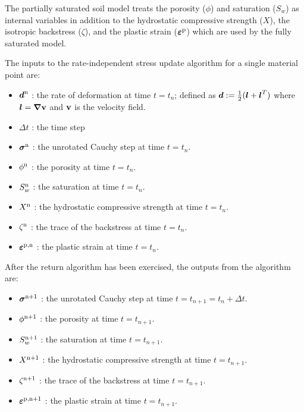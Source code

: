 The partially saturated soil model treats the porosity ($\phi$) and saturation ($S_w$) as internal 
variables in addition to the hydrostatic compressive strength ($X$), the isotropic backstress ($\zeta$), 
and the plastic strain ($\boldsymbol{\varepsilon}^{\text{p}}$) which are used by the fully saturated model.

The inputs to the rate-independent stress update algorithm for a single material point are:
\begin{itemize}
  \item $\boldsymbol{d}^{\text{n}}$ : {\Ochre the rate of deformation at time $t = t_n$; 
        defined as $\boldsymbol{d} := \tfrac{1}{2}(\boldsymbol{l} + \boldsymbol{l}^T)$ where 
        $\boldsymbol{l} = \boldsymbol{\nabla} \mathbf{v}$ and $\mathbf{v}$ is the velocity field.}
  \item $\Delta t$ : {\Ochre the time step}
  \item $\boldsymbol{\sigma}^{\text{n}}$ : {\Ochre the unrotated Cauchy step at time $t = t_n$.}
  \item $\phi^{\text{n}}$ : {\Ochre the porosity at time $t = t_n$.}
  \item $S_w^{\text{n}}$ : {\Ochre the saturation at time $t = t_n$.}
  \item $X^{\text{n}}$ : {\Ochre the hydrostatic compressive strength at time $t = t_n$.}
  \item $\zeta^{\text{n}}$ : {\Ochre the trace of the backstress at time $t = t_n$.}
  \item $\boldsymbol{\varepsilon}^{\text{p},\text{n}}$ : {\Ochre the plastic strain at time $t = t_n$.}
\end{itemize}
After the return algorithm has been exercised, the outputs from the algorithm are:
\begin{itemize}
  \item $\boldsymbol{\sigma}^{\text{n}+1}$ : {\Ochre the unrotated Cauchy step at time $t = t_{n+1} = t_n + \Delta t$.}
  \item $\phi^{\text{n}+1}$ : {\Ochre the porosity at time $t = t_{n+1}$.}
  \item $S_w^{\text{n}+1}$ : {\Ochre the saturation at time $t = t_{n+1}$.}
  \item $X^{\text{n}+1}$ : {\Ochre the hydrostatic compressive strength at time $t = t_{n+1}$.}
  \item $\zeta^{\text{n}+1}$ : {\Ochre the trace of the backstress at time $t = t_{n+1}$.}
  \item $\boldsymbol{\varepsilon}^{\text{p},\text{n}+1}$ : {\Ochre the plastic strain at time $t = t_{n+1}$.}
\end{itemize}

